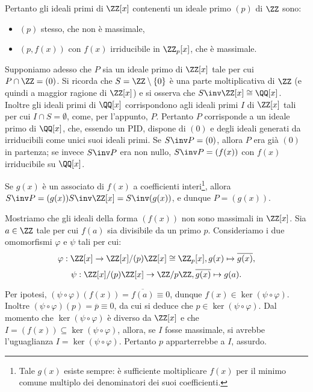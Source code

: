 \documentclass[11pt]{scrartcl}
\begin{document}
	Pertanto gli ideali primi di $\ZZ[x]$ contenenti un ideale primo $(p)$ di $\ZZ$
	sono:
	\begin{itemize}
		\item $(p)$ stesso, che non è massimale,
		\item $(p, f(x))$ con $f(x)$ irriducibile in $\ZZ_p[x]$, che è massimale.
	\end{itemize}
	
	Supponiamo adesso che $P$ sia un ideale primo di $\ZZ[x]$ tale per cui 
	$P \cap \ZZ = (0)$. Si ricorda che $S = \ZZ\setminus \{0\}$ è una parte moltiplicativa di 
	$\ZZ$ (e quindi a maggior ragione di $\ZZ[x]$) e si osserva che $S\inv \ZZ[x] \cong \QQ[x]$. Inoltre gli ideali primi di $\QQ[x]$ corrispondono agli ideali primi $I$
	di $\ZZ[x]$ tali per cui $I \cap S = \emptyset$, come, per l'appunto,
	$P$. Pertanto $P$ corrisponde a un ideale primo di $\QQ[x]$, che, essendo un PID,
	dispone di $(0)$ e degli ideali generati da irriducibili come unici suoi
	ideali primi. Se $S\inv P = (0)$, allora $P$ era già $(0)$ in partenza; se
	invece $S\inv P$ era non nullo, $S\inv P = (f(x))$ con $f(x)$ irriducibile
	su $\QQ[x]$. \medskip
	
	Se $g(x)$ è un associato di $f(x)$ a coefficienti interi\footnote{
		Tale $g(x)$ esiste sempre: è sufficiente moltiplicare $f(x)$ per il minimo
		comune multiplo dei denominatori dei suoi coefficienti.
	}, allora $S\inv P = (g(x)) S\inv \ZZ[x] = S\inv (g(x))$, e dunque $P = (g(x))$. 
	
	
	\begin{remark}
		Mostriamo che gli ideali della forma $(f(x))$ non sono massimali in
		$\ZZ[x]$. Sia $a \in \ZZ$ tale per cui $f(a)$ sia divisibile da un
		primo $p$. Consideriamo i due omomorfismi $\varphi$ e $\psi$ tali
		per cui:
		\[ \varphi : \ZZ[x] \to \ZZ[x]/(p)\ZZ[x] \cong \ZZ_p[x], g(x) \mapsto \overline{g(x)}, \]
		\[ \psi : \ZZ[x]/(p)\ZZ[x] \to \ZZ/p\ZZ, \overline{g(x)} \mapsto g(a). \]
		
		Per ipotesi, $(\psi \circ \varphi)(f(x)) = \overline{f(a)} \equiv 0$, 
		dunque $f(x) \in \ker (\psi \circ \varphi)$. Inoltre $(\psi \circ \varphi)(p)
		= \overline{p} \equiv 0$, da cui si deduce che $p \in \ker (\psi \circ \varphi)$.
		Dal momento che $\ker (\psi \circ \varphi)$ è diverso da $\ZZ[x]$ e che
		$I = (f(x)) \subseteq \ker (\psi \circ \varphi)$, allora, se $I$ fosse
		massimale, si avrebbe l'uguaglianza $I = \ker (\psi \circ \varphi)$. Pertanto
		$p$ apparterrebbe a $I$, assurdo.
	\end{remark}
	
\end{document}
